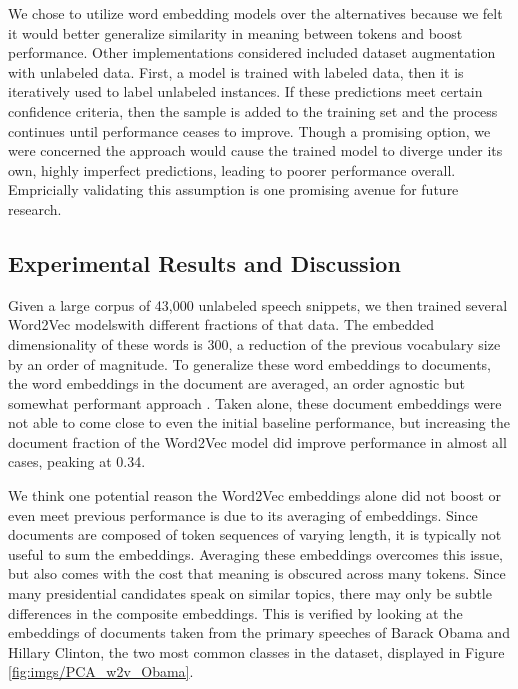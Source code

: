 \documentclass[11pt,a4paper]{article}
\begin{document}

We chose to utilize word embedding models over the alternatives because we felt it would better generalize similarity in meaning between tokens and boost performance. Other implementations considered included dataset augmentation with unlabeled data. First, a model is trained with labeled data, then it is iteratively used to label unlabeled instances. If these predictions meet certain confidence criteria, then the sample is added to the training set and the process continues until performance ceases to improve. Though a promising option, we were concerned the approach would cause the trained model to diverge under its own, highly imperfect predictions, leading to poorer performance overall. Empricially validating this assumption is one promising avenue for future research.


\subsection{Experimental Results and Discussion}%
\label{subseq:experimental_results_and_discussion}

Given a large corpus of 43,000 unlabeled speech snippets, we then trained several Word2Vec modelswith different fractions of that data. The embedded dimensionality of these words is 300, a reduction of the previous vocabulary size by an order of magnitude. To generalize these word embeddings to documents, the word embeddings in the document are averaged, an order agnostic but somewhat performant approach \cite{turney2010frequency}. Taken alone, these document embeddings were not able to come close to even the initial baseline performance, but increasing the document fraction of the Word2Vec model did improve performance in almost all cases, peaking at 0.34.

We think one potential reason the Word2Vec embeddings alone did not boost or even meet previous performance is due to its averaging of embeddings. Since documents are composed of token sequences of varying length, it is typically not useful to sum the embeddings. Averaging these embeddings overcomes this issue, but also comes with the cost that meaning is obscured across many tokens. Since many presidential candidates speak on similar topics, there may only be subtle differences in the composite embeddings. This is verified by looking at the embeddings of documents taken from the primary speeches of Barack Obama and Hillary Clinton, the two most common classes in the dataset, displayed in Figure \ref{fig:imgs/PCA_w2v_Obama}. 
\end{document}

